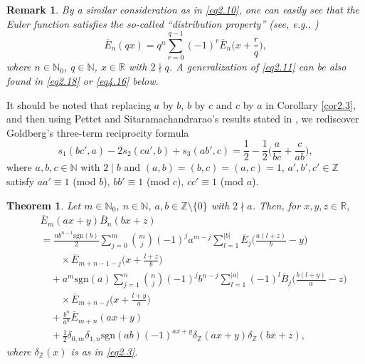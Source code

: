 \documentclass[reqno]{amsart}
\numberwithin{equation}{section}
\newtheorem{theorem}[thm]{Theorem}
\newtheorem{remark}[thm]{Remark}
\begin{document}
\begin{remark}\label{rem2.4}
By a similar consideration as in \eqref{eq2.10}, one can easily see that the Euler function satisfies the so-called ``distribution property'' (see, e.g., \cite[Equation (3.44)]{he3})
\begin{equation}\label{eq2.11}
\overline{E}_{n}(qx)=q^{n}\sum_{r=0}^{q-1}(-1)^{r}\overline{E}_{n}\biggl(x+\frac{r}{q}\biggl),
\end{equation}
where $n\in\mathbb{N}_{0}$, $q\in\mathbb{N}$, $x\in\mathbb{R}$ with $2\nmid q$. A generalization of \eqref{eq2.11} can be also found in \eqref{eq2.18} or \eqref{eq4.16} below.
\end{remark}

It should be noted that replacing $a$ by $b$, $b$ by $c$ and $c$ by $a$ in Corollary \ref{cor2.3}, and then using Pettet and Sitaramachandrarao's results stated in \cite[Equations (3.10), (3.11) and (3.12]{pettet}, we rediscover Goldberg's \cite[Theorem 5.12]{goldberg} three-term reciprocity formula
\begin{equation}\label{eq2.12}
s_{1}(bc',a)-2s_{2}(ca',b)+s_{3}(ab',c)=\frac{1}{2}-\frac{1}{2}\biggl(\frac{a}{bc}+\frac{c}{ab}\biggl),
\end{equation}
where $a,b,c\in\mathbb{N}$ with $2\mid b$ and $(a,b)=(b,c)=(a,c)=1$, $a',b',c'\in\mathbb{Z}$ satisfy $aa'\equiv 1$ (mod $b$), $bb'\equiv 1$ (mod $c$), $cc'\equiv 1$ (mod $a$).

\begin{theorem}\label{thm2.5} Let $m\in\mathbb{N}_{0}$, $n\in\mathbb{N}$, $a,b\in\mathbb{Z}\setminus\{0\}$ with $2\nmid a$. Then, for $x,y,z\in\mathbb{R}$,
\begin{eqnarray}\label{eq2.13}
&&\overline{E}_{m}(ax+y)\overline{B}_{n}(bx+z)\nonumber\\
&&=\frac{nb^{n-1}\mathrm{sgn}(b)}{2}\sum_{j=0}^{m}
\binom{m}{j}(-1)^{j}a^{m-j}\sum_{l=1}^{|b|}\overline{E}_{j}\biggl(\frac{a(l+z)}{b}-y\biggl)\nonumber\\
&&\qquad\times\overline{E}_{m+n-1-j}\biggl(x+\frac{l+z}{b}\biggl)\nonumber\\
&&\quad+a^{m}\mathrm{sgn}(a)\sum_{j=1}^{n}\binom{n}{j}(-1)^{j}b^{n-j}\sum_{l=1}^{|a|}(-1)^{l}
\overline{B}_{j}\biggl(\frac{b(l+y)}{a}-z\biggl)\nonumber\\
&&\qquad\times\overline{E}_{m+n-j}\biggl(x+\frac{l+y}{a}\biggl)\nonumber\\
&&\quad+\frac{b^{n}}{a^{n}}\overline{E}_{m+n}(ax+y)\nonumber\\
&&\quad+\frac{1}{2}\delta_{0,m}\delta_{1,n}\mathrm{sgn}(ab)(-1)^{ax+y}\delta_{\mathbb{Z}}(ax+y)\delta_{\mathbb{Z}}(bx+z),
\end{eqnarray}
where $\delta_{\mathbb{Z}}(x)$ is as in \eqref{eq2.3}.
\end{theorem}
\end{document}
